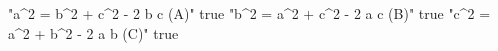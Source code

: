 "a^2 = b^2 + c^2 - 2 b c \cos(A)" true
"b^2 = a^2 + c^2 - 2 a c \cos(B)" true
"c^2 = a^2 + b^2 - 2 a b \cos(C)" true
